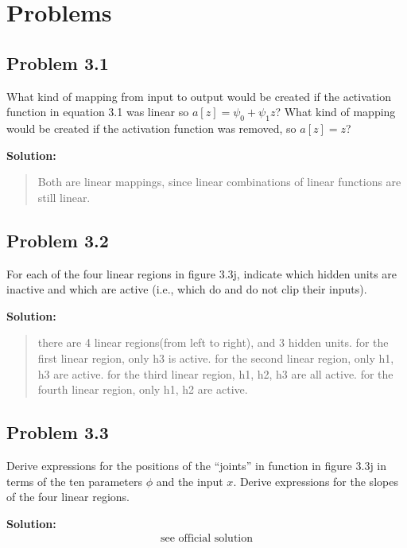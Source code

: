 \documentclass{article}
\begin{document}
\section*{Problems}

    \subsection*{Problem 3.1}
    What kind of mapping from input to output would be created if the activation function in equation 3.1 was linear so $a[z] = \psi_0 + \psi_1z$? What kind of mapping would be created if the activation function was removed, so $a[z] = z$?

        \vspace{1cm}
        \textbf{Solution:}
        \begin{quote}
            Both are linear mappings, since linear combinations of linear functions are still linear.
        \end{quote}


    \subsection*{Problem 3.2}
    For each of the four linear regions in figure 3.3j, indicate which hidden units are inactive and which are active (i.e., which do and do not clip their inputs).

        \vspace{1cm}
        \textbf{Solution:}
        \begin{quote}
            there are 4 linear regions(from left to right), and 3 hidden units.
            for the first linear region, only h3 is active.
            for the second linear region, only h1, h3 are active.
            for the third linear region, h1, h2, h3 are all active.
            for the fourth linear region, only h1, h2 are active.
        \end{quote}

    \subsection*{Problem 3.3}
    Derive expressions for the positions of the “joints” in function in figure 3.3j in terms of the ten parameters $\phi$ and the input $x$. Derive expressions for the slopes of the four linear regions.

        \vspace{1cm}
        \textbf{Solution:}
        \begin{align*}
            \text{see official solution}
        \end{align*}
\end{document}
